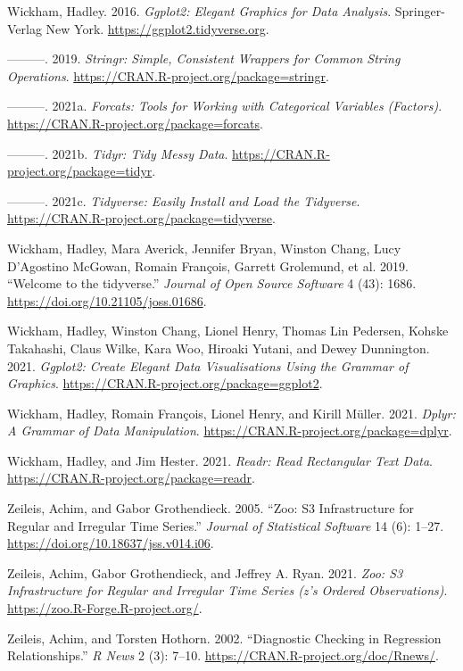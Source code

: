 \documentclass[
]{article}
\newlength{\cslhangindent}
\newlength{\cslentryspacingunit} %
\newenvironment{CSLReferences}[2] %
 {%
  \setlength{\parindent}{0pt}
  \ifodd #1
  \let\oldpar\par
  \def\par{\hangindent=\cslhangindent\oldpar}
  \fi
  \setlength{\parskip}{#2\cslentryspacingunit}
 }%
 {}
\begin{document}
\begin{CSLReferences}{1}{0}
\leavevmode{}%
Wickham, Hadley. 2016. \emph{Ggplot2: Elegant Graphics for Data
Analysis}. Springer-Verlag New York.
\url{https://ggplot2.tidyverse.org}.

\leavevmode{}%
---------. 2019. \emph{Stringr: Simple, Consistent Wrappers for Common
String Operations}. \url{https://CRAN.R-project.org/package=stringr}.

\leavevmode{}%
---------. 2021a. \emph{Forcats: Tools for Working with Categorical
Variables (Factors)}. \url{https://CRAN.R-project.org/package=forcats}.

\leavevmode{}%
---------. 2021b. \emph{Tidyr: Tidy Messy Data}.
\url{https://CRAN.R-project.org/package=tidyr}.

\leavevmode{}%
---------. 2021c. \emph{Tidyverse: Easily Install and Load the
Tidyverse}. \url{https://CRAN.R-project.org/package=tidyverse}.

\leavevmode{}%
Wickham, Hadley, Mara Averick, Jennifer Bryan, Winston Chang, Lucy
D'Agostino McGowan, Romain François, Garrett Grolemund, et al. 2019.
{``Welcome to the {tidyverse}.''} \emph{Journal of Open Source Software}
4 (43): 1686. \url{https://doi.org/10.21105/joss.01686}.

\leavevmode{}%
Wickham, Hadley, Winston Chang, Lionel Henry, Thomas Lin Pedersen,
Kohske Takahashi, Claus Wilke, Kara Woo, Hiroaki Yutani, and Dewey
Dunnington. 2021. \emph{Ggplot2: Create Elegant Data Visualisations
Using the Grammar of Graphics}.
\url{https://CRAN.R-project.org/package=ggplot2}.

\leavevmode{}%
Wickham, Hadley, Romain François, Lionel Henry, and Kirill Müller. 2021.
\emph{Dplyr: A Grammar of Data Manipulation}.
\url{https://CRAN.R-project.org/package=dplyr}.

\leavevmode{}%
Wickham, Hadley, and Jim Hester. 2021. \emph{Readr: Read Rectangular
Text Data}. \url{https://CRAN.R-project.org/package=readr}.

\leavevmode{}%
Zeileis, Achim, and Gabor Grothendieck. 2005. {``Zoo: S3 Infrastructure
for Regular and Irregular Time Series.''} \emph{Journal of Statistical
Software} 14 (6): 1--27. \url{https://doi.org/10.18637/jss.v014.i06}.

\leavevmode{}%
Zeileis, Achim, Gabor Grothendieck, and Jeffrey A. Ryan. 2021.
\emph{Zoo: S3 Infrastructure for Regular and Irregular Time Series (z's
Ordered Observations)}. \url{https://zoo.R-Forge.R-project.org/}.

\leavevmode{}%
Zeileis, Achim, and Torsten Hothorn. 2002. {``Diagnostic Checking in
Regression Relationships.''} \emph{R News} 2 (3): 7--10.
\url{https://CRAN.R-project.org/doc/Rnews/}.

\end{CSLReferences}
\end{document}
